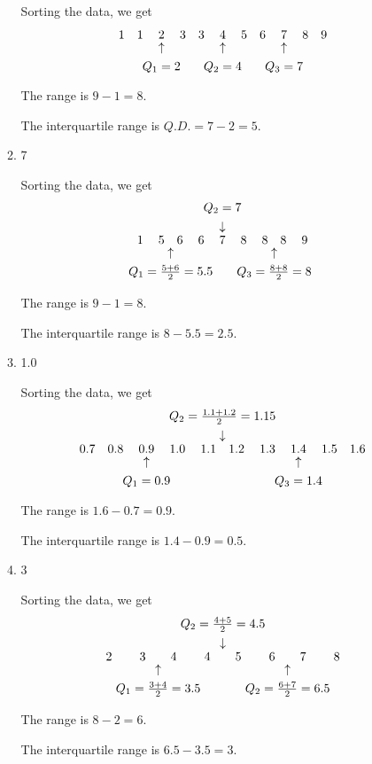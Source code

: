 \documentclass{report}
\newcommand\typel[2]{
  \mathbin{\mathop{#1\kern0pt}%
    \limits_{\raisebox{3.6ex}{\hbox to0pt{\hss\strut$\uparrow$\hss}}\hbox to0pt{\hss#2\hss}}}
}
\newcommand\typem[2]{
  \mathbin{\mathop{#1\kern0pt}%
    \limits^{\raisebox{3.6ex}{\hbox to0pt{\hss#2\hss}}\hbox to0pt{\hss\strut$\downarrow$\hss}}}
}
\begin{document}
\begin{multicols}{2}
\begin{enumerate}
\begin{enumerate}
                  Sorting the data, we get
                  \[1 \quad 1 \quad \typel{2}{$Q_1 = 2$} \quad 3 \quad 3 \quad \typel{4}{$Q_2 = 4$} \quad 5 \quad 6 \quad \typel{7}{$Q_3 = 7$} \quad 8 \quad 9\]

                  The range is $9 - 1 = 8$.

                  The interquartile range is $Q.D. = 7 - 2 = 5$.

            \item 7        
                  \sol{}

                  Sorting the data, we get
                  \[1 \typel{\quad 5 \quad 6 \quad}{$Q_1 = \frac{5 + 6}{2} = 5.5$} 6 \typem{\quad 7 \quad}{$Q_2 = 7$} 8 \typel{\quad 8 \quad 8 \quad}{$Q_3 = \frac{8 + 8}{2} = 8$} 9\]

                  The range is $9 - 1 = 8$.

                  The interquartile range is $8 - 5.5 = 2.5$.

            \item 1.0      \   
                  \sol{}

                  Sorting the data, we get
                  \[0.7 \quad 0.8 \quad \typel{0.9}{$Q_1 = 0.9$} \quad 1.0 \typem{ \quad 1.1 \quad 1.2 \quad }{$Q_2 = \frac{1.1 + 1.2}{2} = 1.15$} 1.3 \quad \typel{1.4}{$Q_3 = 1.4$} \quad 1.5 \quad 1.6\]

                  The range is $1.6 - 0.7 = 0.9$.

                  The interquartile range is $1.4 - 0.9 = 0.5$.

            \item 3       
                  \sol{}

                  Sorting the data, we get
                  \[2 \qquad \typel{3 \qquad 4}{$Q_1 = \frac{3 + 4}{2} = 3.5$} \qquad \typem{ 4 \qquad 5}{$Q_2 = \frac{4 +5}{2} = 4.5$} \qquad \typel{6 \qquad 7}{$Q_2 = \frac{6 + 7}{2} = 6.5$} \qquad 8\]

                  The range is $8 - 2 = 6$.

                  The interquartile range is $6.5 - 3.5 = 3$.
          \end{enumerate}


\end{enumerate}
\end{multicols}
\end{document}
